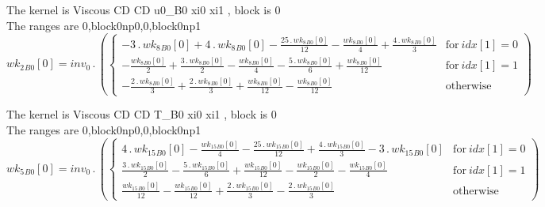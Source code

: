 \documentclass{article}
\begin{document}
\noindent The kernel is Viscous CD CD u0_B0 xi0 xi1 , block is 0\\\noindent The ranges are 0,block0np0,0,block0np1\\\begin{dmath}{wk_{2}{_{B0}}}[{0}] = inv_0 \,.\, \left(\begin{cases} - 3 \,.\, {wk_{8}{_{B0}}}[{0}] + 4 \,.\, {wk_{8}{_{B0}}}[{0}] - \frac{25 \,.\, {wk_{8}{_{B0}}}[{0}]}{12} - \frac{{wk_{8}{_{B0}}}[{0}]}{4} + \frac{4 \,.\, {wk_{8}{_{B0}}}[{0}]}{3} & 
\text{for}\: {idx}[{1}] = 0 \\- \frac{{wk_{8}{_{B0}}}[{0}]}{2} + \frac{3 \,.\, {wk_{8}{_{B0}}}[{0}]}{2} - \frac{{wk_{8}{_{B0}}}[{0}]}{4} - \frac{5 \,.\, {wk_{8}{_{B0}}}[{0}]}{6} + \frac{{wk_{8}{_{B0}}}[{0}]}{12} & \text{for}\: {idx}[{1}] = 1 \\- 
\frac{2 \,.\, {wk_{8}{_{B0}}}[{0}]}{3} + \frac{2 \,.\, {wk_{8}{_{B0}}}[{0}]}{3} + \frac{{wk_{8}{_{B0}}}[{0}]}{12} - \frac{{wk_{8}{_{B0}}}[{0}]}{12} & \text{otherwise} \end{cases}\right)\end{dmath}

\noindent The kernel is Viscous CD CD T_B0 xi0 xi1 , block is 0\\\noindent The ranges are 0,block0np0,0,block0np1\\\begin{dmath}{wk_{5}{_{B0}}}[{0}] = inv_0 \,.\, \left(\begin{cases} 4 \,.\, {wk_{15}{_{B0}}}[{0}] - \frac{{wk_{15}{_{B0}}}[{0}]}{4} - \frac{25 \,.\, {wk_{15}{_{B0}}}[{0}]}{12} + \frac{4 \,.\, {wk_{15}{_{B0}}}[{0}]}{3} - 3 \,.\, {wk_{15}{_{B0}}}[{0}] 
& \text{for}\: {idx}[{1}] = 0 \\\frac{3 \,.\, {wk_{15}{_{B0}}}[{0}]}{2} - \frac{5 \,.\, {wk_{15}{_{B0}}}[{0}]}{6} + \frac{{wk_{15}{_{B0}}}[{0}]}{12} - \frac{{wk_{15}{_{B0}}}[{0}]}{2} - \frac{{wk_{15}{_{B0}}}[{0}]}{4} & \text{for}\: {idx}[{1}] = 1 
\\\frac{{wk_{15}{_{B0}}}[{0}]}{12} - \frac{{wk_{15}{_{B0}}}[{0}]}{12} + \frac{2 \,.\, {wk_{15}{_{B0}}}[{0}]}{3} - \frac{2 \,.\, {wk_{15}{_{B0}}}[{0}]}{3} & \text{otherwise} \end{cases}\right)\end{dmath}
\end{document}
